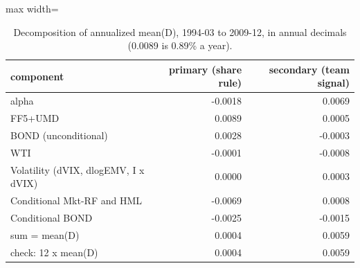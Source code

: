 \begin{table}[H]
\centering\small
\caption{Decomposition of annualized mean(D), 1994-03 to 2009-12, in annual decimals (0.0089 is 0.89\% a year).}
\label{tab:m8_decomposition}
\begin{adjustbox}{max width=\linewidth}
\begin{tabular}{lrr}
\toprule
component & primary (share rule) & secondary (team signal) \\
\midrule
alpha & -0.0018 & 0.0069 \\
FF5+UMD & 0.0089 & 0.0005 \\
BOND (unconditional) & 0.0028 & -0.0003 \\
WTI & -0.0001 & -0.0008 \\
Volatility (dVIX, dlogEMV, I x dVIX) & 0.0000 & 0.0003 \\
Conditional Mkt-RF and HML & -0.0069 & 0.0008 \\
Conditional BOND & -0.0025 & -0.0015 \\
sum = mean(D) & 0.0004 & 0.0059 \\
check: 12 x mean(D) & 0.0004 & 0.0059 \\
\bottomrule
\end{tabular}
\end{adjustbox}
\end{table}
